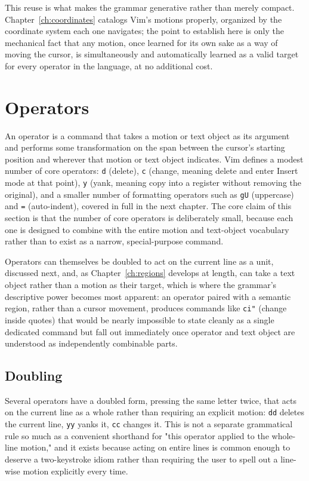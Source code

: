 This reuse is what makes the grammar generative rather than merely compact. Chapter~\ref{ch:coordinates} catalogs Vim's motions properly, organized by the coordinate system each one navigates; the point to establish here is only the mechanical fact that any motion, once learned for its own sake as a way of moving the cursor, is simultaneously and automatically learned as a valid target for every operator in the language, at no additional cost.

\section{Operators}

An operator is a command that takes a motion or text object as its argument and performs some transformation on the span between the cursor's starting position and wherever that motion or text object indicates. Vim defines a modest number of core operators: \texttt{d} (delete), \texttt{c} (change, meaning delete and enter Insert mode at that point), \texttt{y} (yank, meaning copy into a register without removing the original), and a smaller number of formatting operators such as \texttt{gU} (uppercase) and \texttt{=} (auto-indent), covered in full in the next chapter. The core claim of this section is that the number of core operators is deliberately small, because each one is designed to combine with the entire motion and text-object vocabulary rather than to exist as a narrow, special-purpose command.

Operators can themselves be doubled to act on the current line as a unit, discussed next, and, as Chapter~\ref{ch:regions} develops at length, can take a text object rather than a motion as their target, which is where the grammar's descriptive power becomes most apparent: an operator paired with a semantic region, rather than a cursor movement, produces commands like \texttt{ci"} (change inside quotes) that would be nearly impossible to state cleanly as a single dedicated command but fall out immediately once operator and text object are understood as independently combinable parts.

\subsection{Doubling}
\label{sec:doubling}

Several operators have a doubled form, pressing the same letter twice, that acts on the current line as a whole rather than requiring an explicit motion: \texttt{dd} deletes the current line, \texttt{yy} yanks it, \texttt{cc} changes it. This is not a separate grammatical rule so much as a convenient shorthand for "this operator applied to the whole-line motion," and it exists because acting on entire lines is common enough to deserve a two-keystroke idiom rather than requiring the user to spell out a line-wise motion explicitly every time.

